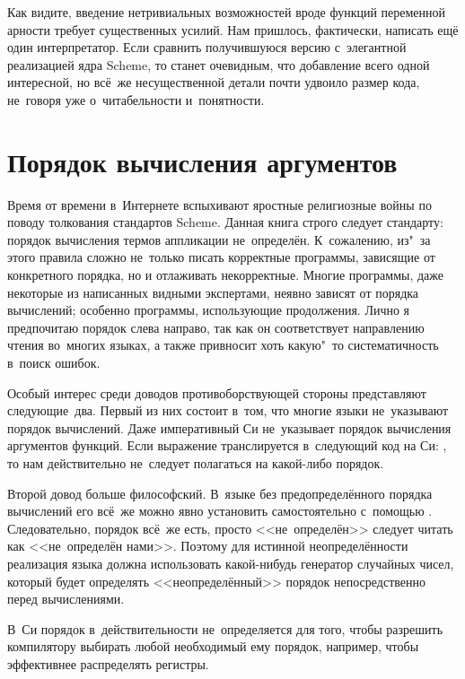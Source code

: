 Как видите, введение нетривиальных возможностей вроде функций переменной арности
требует существенных усилий. Нам пришлось, фактически, написать ещё один
интерпретатор. Если сравнить получившуюся версию с~элегантной реализацией ядра
Scheme, то станет очевидным, что добавление всего одной интересной, но всё~же
несущественной детали почти удвоило размер кода, не~говоря уже о~читабельности
и~понятности.


\section{Порядок вычисления аргументов}\label{denotational/sect:eval-order}

Время от времени в~Интернете вспыхивают яростные религиозные войны по поводу
толкования стандартов Scheme. Данная книга строго следует стандарту: порядок
вычисления термов аппликации не~определён. К~сожалению, из"~за этого правила
сложно не~только писать корректные программы, зависящие от конкретного порядка,
но и отлаживать некорректные. Многие программы, даже некоторые из написанных
видными экспертами, неявно зависят от порядка вычислений; особенно программы,
использующие продолжения. Лично я предпочитаю порядок слева направо, так как
он соответствует направлению чтения во~многих языках, а также привносит хоть
какую"~то систематичность в~поиск ошибок.

Особый интерес среди доводов противоборствующей стороны представляют
следующие~два. Первый из них состоит в~том, что многие языки не~указывают
порядок вычислений. Даже императивный Си не~указывает порядок вычисления
аргументов функций. Если выражение  транслируется
в~следующий код на Си: , то нам действительно
не~следует полагаться на какой-либо порядок.

Второй довод больше философский. В~языке без предопределённого порядка
вычислений его всё~же можно явно установить самостоятельно с~помощью .
Следовательно, порядок всё~же есть, просто <<не~определён>> следует читать как
<<не~определён нами>>. Поэтому для истинной неопределённости реализация языка
должна использовать какой-нибудь генератор случайных чисел, который будет
определять <<неопределённый>> порядок непосредственно перед вычислениями.

В~Си порядок в~действительности не~определяется для того, чтобы разрешить
компилятору выбирать любой необходимый ему порядок, например, чтобы эффективнее
распределять регистры.

